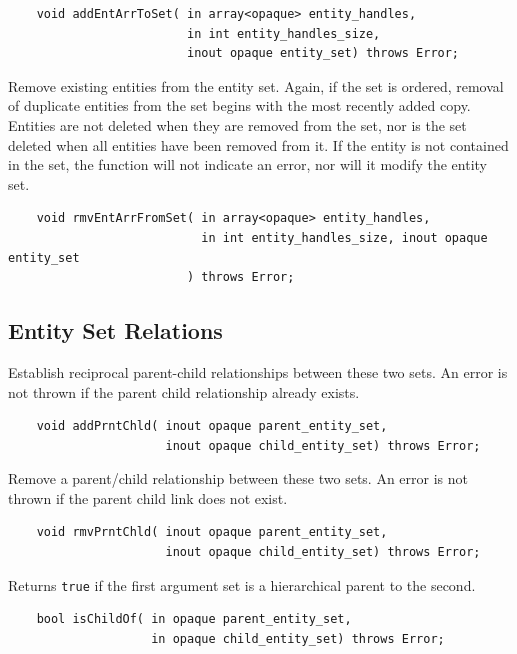 \documentclass{article}
\begin{document}
\begin{verbatim}
    void addEntArrToSet( in array<opaque> entity_handles,
                         in int entity_handles_size, 
                         inout opaque entity_set) throws Error;
\end{verbatim}

Remove existing entities from the entity set. Again, if the set 
is ordered, removal of duplicate entities from the set begins 
with the most recently added copy. Entities are not deleted when 
they are removed from the set, nor is the set deleted when all 
entities have been removed from it. If the entity is not contained 
in the set, the function will not indicate an error, nor will 
it modify the entity set.

\begin{verbatim}
    void rmvEntArrFromSet( in array<opaque> entity_handles,
                           in int entity_handles_size, inout opaque entity_set
                         ) throws Error;
\end{verbatim}

\subsection{Entity Set Relations}

Establish reciprocal parent-child relationships between these 
two sets. An error is not thrown if the parent child relationship 
already exists.
\begin{verbatim}
    void addPrntChld( inout opaque parent_entity_set,
                      inout opaque child_entity_set) throws Error;
\end{verbatim}

Remove a parent/child relationship between these two sets. An 
error is not thrown if the parent child link does not exist.
\begin{verbatim}
    void rmvPrntChld( inout opaque parent_entity_set,
                      inout opaque child_entity_set) throws Error;
\end{verbatim}

Returns {\tt true} if the first argument set is a hierarchical parent 
to the second.
\begin{verbatim}
    bool isChildOf( in opaque parent_entity_set, 
                    in opaque child_entity_set) throws Error;
\end{verbatim}
\end{document}
